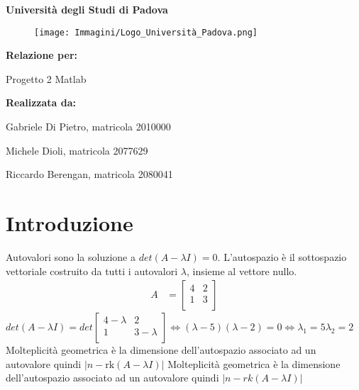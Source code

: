 \documentclass[10pt]{article}
\newcommand{\abs}[1]{\left|#1\right|}
\renewcommand{\familydefault}{\rmdefault} %
\begin{document}
\begin{titlepage}
    \centering
    {\Huge \textbf{Università degli Studi di Padova} \par}
    \vspace{1cm}
    \begin{figure}[h!]
        \centering
        \texttt{[image: Immagini/Logo\_Università\_Padova.png]}
    \end{figure}
    \vspace{1.5cm}
    {\LARGE \textbf{Relazione per:} \par}
    {\Huge Progetto 2 Matlab \par}
    \vfill
    \textbf{Realizzata da:} \par
    Gabriele Di Pietro, matricola 2010000 \par
    Michele Dioli, matricola 2077629 \par
    Riccardo Berengan, matricola 2080041 \par
    \vspace{0.5cm}
\end{titlepage}
    \renewcommand{\familydefault}{\sfdefault} %
    \fontsize{10}{12}\selectfont
    \newpage
    \section{Introduzione}
    Autovalori sono la soluzione a $det(A-\lambda I) = 0$. 
    L'autospazio è il sottospazio vettoriale costruito da tutti i autovalori $\lambda$, insieme al vettore nullo.
    \begin{align*}
        A &= \begin{bmatrix}
            4 & 2 \\
            1 & 3 \\
        \end{bmatrix}
    \end{align*}
    $det(A-\lambda I) = det\begin{bmatrix}
        4-\lambda & 2 \\
        1 & 3-\lambda \\
    \end{bmatrix} \iff (\lambda - 5)(\lambda-2) = 0 \iff \lambda_1 = 5 \lambda_2 = 2$
    Molteplicità geometrica è la dimensione dell'autospazio associato ad un autovalore quindi $\abs{n - \text{rk}(A - \lambda I)}$
    Molteplicità geometrica è la dimensione dell'autospazio associato ad un autovalore quindi $|n - rk(A - \lambda I)|$
\end{document}
